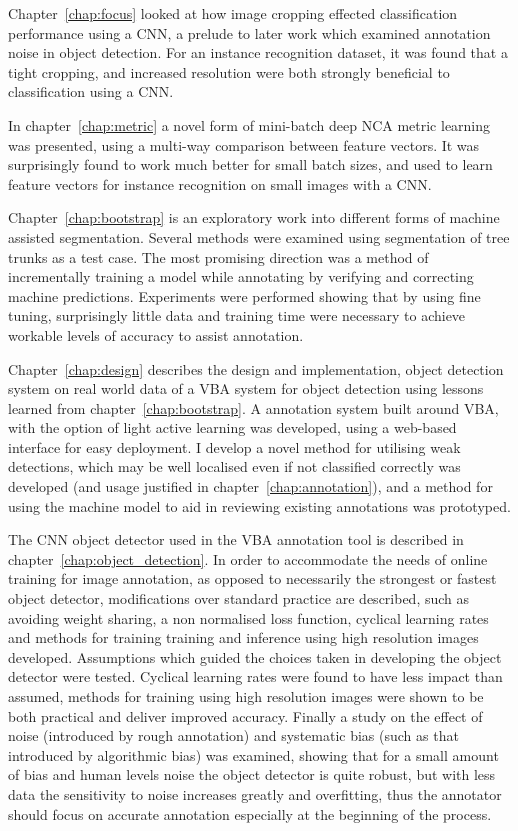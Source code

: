 Chapter~\ref{chap:focus} looked at how image cropping effected classification performance using a \gls{CNN}, a prelude to later work which examined annotation noise in object detection. For an instance recognition dataset, it was found that a tight cropping, and increased resolution were both strongly beneficial to classification using a \gls{CNN}.

In chapter~\ref{chap:metric} a novel form of mini-batch deep \gls{NCA} metric learning was presented, using a multi-way comparison between feature vectors. It was surprisingly found to work much better for small batch sizes, and used to learn feature vectors for instance recognition on small images with a \gls{CNN}.

Chapter~\ref{chap:bootstrap} is an exploratory work into different forms of machine assisted segmentation. Several methods were examined using segmentation of tree trunks as a test case. The most promising direction was a method of incrementally training a model while annotating by verifying and correcting machine predictions. Experiments were performed showing that by using fine tuning, surprisingly little data and training time were necessary to achieve workable levels of accuracy to assist annotation. 

Chapter~\ref{chap:design} describes the design and implementation, object detection system on real world data  of a \gls{VBA} system for object detection using lessons learned from chapter~\ref{chap:bootstrap}. A annotation system built around \gls{VBA}, with the option of light active learning was developed, using a web-based interface for easy deployment. I develop a novel method for utilising weak detections, which may be well localised even if not classified correctly was developed (and usage justified in chapter~\ref{chap:annotation}), and a method for using the machine model to aid in reviewing existing annotations was prototyped.

The \gls{CNN} object detector used in the \gls{VBA} annotation tool is described in chapter~\ref{chap:object_detection}. In order to accommodate the needs of online training for image annotation, as opposed to necessarily the strongest or fastest object detector, modifications over standard practice are described, such as avoiding weight sharing, a non normalised loss function, cyclical learning rates and methods for training training and inference using high resolution images developed. Assumptions which guided the choices taken in developing the object detector were tested. Cyclical learning rates were found to have less impact than assumed, methods for training using high resolution images were shown to be both practical and deliver improved accuracy. Finally a study on the effect of noise (introduced by rough annotation) and systematic bias (such as that introduced by algorithmic bias) was examined, showing that for a small amount of bias and human levels noise the object detector is quite robust, but with less data the sensitivity to noise increases greatly and overfitting, thus the annotator should focus on accurate annotation especially at the beginning of the process. 

